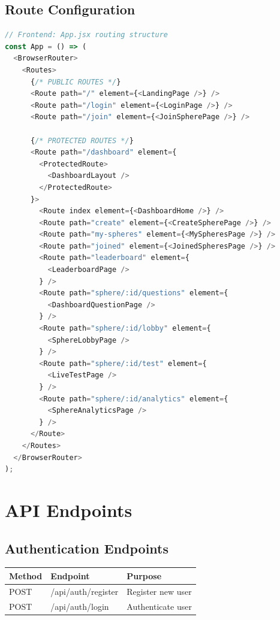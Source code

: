 \documentclass[12pt,a4paper]{report}
\newenvironment{reqbox}{%
  \begin{tcolorbox}[colback=lightgray,colframe=rulecol,
    leftrule=3pt,rightrule=0.4pt,toprule=0.4pt,bottomrule=0.4pt,
    arc=2pt,boxsep=2pt,left=4pt,right=4pt,top=3pt,bottom=3pt,breakable]
}{\end{tcolorbox}}
\newcommand{\rA}{\rowcolor{white}}
\newcommand{\rB}{\rowcolor{lightgray}}
\newcommand{\rH}{\rowcolor{headcol}}
\begin{document}
\subsection{Route Configuration}

\begin{lstlisting}[language=JavaScript]
// Frontend: App.jsx routing structure
const App = () => (
  <BrowserRouter>
    <Routes>
      {/* PUBLIC ROUTES */}
      <Route path="/" element={<LandingPage />} />
      <Route path="/login" element={<LoginPage />} />
      <Route path="/join" element={<JoinSpherePage />} />
      
      {/* PROTECTED ROUTES */}
      <Route path="/dashboard" element={
        <ProtectedRoute>
          <DashboardLayout />
        </ProtectedRoute>
      }>
        <Route index element={<DashboardHome />} />
        <Route path="create" element={<CreateSpherePage />} />
        <Route path="my-spheres" element={<MySpheresPage />} />
        <Route path="joined" element={<JoinedSpheresPage />} />
        <Route path="leaderboard" element={
          <LeaderboardPage />
        } />
        <Route path="sphere/:id/questions" element={
          <DashboardQuestionPage />
        } />
        <Route path="sphere/:id/lobby" element={
          <SphereLobbyPage />
        } />
        <Route path="sphere/:id/test" element={
          <LiveTestPage />
        } />
        <Route path="sphere/:id/analytics" element={
          <SphereAnalyticsPage />
        } />
      </Route>
    </Routes>
  </BrowserRouter>
);
\end{lstlisting}

\section{API Endpoints}

\subsection{Authentication Endpoints}

\begin{reqbox}
  \begin{tabular}{|l|l|l|}
    \hline
    \rH \textbf{Method} & \textbf{Endpoint} & \textbf{Purpose} \\
    \hline
    \rA POST & /api/auth/register & Register new user \\
    \hline
    \rB POST & /api/auth/login & Authenticate user \\
    \hline
  \end{tabular}
\end{reqbox}
\end{document}
